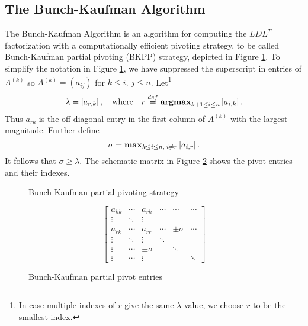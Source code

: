 \documentclass[11pt]{article}
\begin{document}
\subsection{The Bunch-Kaufman Algorithm}\label{Sec:BKA}
The Bunch-Kaufman Algorithm is an algorithm for computing the $LDL^T$ factorization with a computationally efficient pivoting strategy, to be called Bunch-Kaufman partial pivoting (BKPP) strategy, depicted in Figure \ref{alg:bkpp}. 
To simplify the notation in Figure \ref{alg:bkpp}, we have suppressed the superscript in entries of $A^{(k)}$ so
$A^{(k)} = (a_{i j})$ for $k \le i,~j \le n$.
Let\footnote{In case multiple indexes of $r$ give the same $\lambda$ value, we choose $r$ to be the smallest index.}
\[ \lambda  = \left|a_{r, k}\right|, \quad \mbox{where} \quad r \stackrel{def}{=} {\bf argmax}_{k +1 \le i \le n} \left|a_{i, k}\right|.\]
Thus $a_{r k}$ is the off-diagonal entry in the first column of $A^{(k)}$ with the largest magnitude. Further define 
\[\sigma = {\bf max}_{k \le i \le n, \; i \not= r} \left|a_{i, r}\right|. \]
It follows that $\sigma \ge \lambda$. The schematic matrix in Figure \ref{Fig:Bunch-Kaufman partial pivot entries} shows the pivot entries and their indexes. 
\begin{figure}[htbp]
\centering
{}
\caption{Bunch-Kaufman partial pivoting strategy}\label{alg:bkpp}
\end{figure}
\begin{figure}[htbp]
$$
\left[ 
\begin{array}{cccccc}
a_{kk} & \cdots & a_{rk} & \cdots & \cdots & \cdots \\
\vdots & \ddots & \vdots &  &  &  \\
a_{rk} & \cdots & a_{rr} & \cdots & \pm \sigma & \cdots \\
\vdots & \ddots & \vdots & \ddots & &  \\
\vdots & \cdots & \pm \sigma & & \ddots &  \\
\vdots & \cdots & \vdots & &  & \ddots
\end{array}
\right]
$$
\caption{Bunch-Kaufman partial pivot entries} \label{Fig:Bunch-Kaufman partial pivot entries}
\end{figure}
\end{document}
